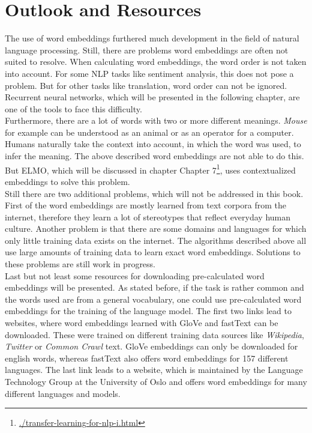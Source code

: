 \documentclass[]{krantz}
\renewcommand{\href}[2]{#2\footnote{\url{#1}}}
\begin{document}
\hypertarget{outlook-and-resources}{%
\section{Outlook and Resources}\label{outlook-and-resources}}

The use of word embeddings furthered much development in the field of natural language processing. Still, there are problems word embeddings are often not suited to resolve. When calculating word embeddings, the word order is not taken into account. For some NLP tasks like sentiment analysis, this does not pose a problem. But for other tasks like translation, word order can not be ignored. Recurrent neural networks, which will be presented in the following chapter, are one of the tools to face this difficulty.\\
Furthermore, there are a lot of words with two or more different meanings. \emph{Mouse} for example can be understood as an animal or as an operator for a computer. Humans naturally take the context into account, in which the word was used, to infer the meaning. The above described word embeddings are not able to do this. But ELMO, which will be discussed in chapter \href{./transfer-learning-for-nlp-i.html}{Chapter 7}, uses contextualized embeddings to solve this problem.\\
Still there are two additional problems, which will not be addressed in this book. First of the word embeddings are mostly learned from text corpora from the internet, therefore they learn a lot of stereotypes that reflect everyday human culture. Another problem is that there are some domains and languages for which only little training data exists on the internet. The algorithms described above all use large amounts of training data to learn exact word embeddings. Solutions to these problems are still work in progress.\\
Last but not least some resources for downloading pre-calculated word embeddings will be presented. As stated before, if the task is rather common and the words used are from a general vocabulary, one could use pre-calculated word embeddings for the training of the language model. The first two links lead to websites, where word embeddings learned with GloVe and fastText can be downloaded. These were trained on different training data sources like \emph{Wikipedia}, \emph{Twitter} or \emph{Common Crawl} text. GloVe embeddings can only be downloaded for english words, whereas fastText also offers word embeddings for 157 different languages. The last link leads to a website, which is maintained by the Language Technology Group at the University of Oslo and offers word embeddings for many different languages and models.
\end{document}
